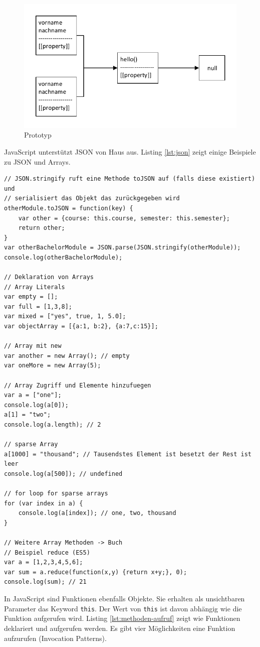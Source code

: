 \begin{figure}
\centering
\includegraphics[width=0.7\linewidth]{fig/prototyp}
\caption{Prototyp}
\label{fig:prototyp}
\end{figure}

JavaScript unterstützt JSON von Haus aus. Listing \ref{lst:json} zeigt einige Beispiele zu JSON und Arrays.

\begin{lstlisting}[label=lst:json,caption=JSON]
// JSON.stringify ruft eine Methode toJSON auf (falls diese existiert) und 
// serialisiert das Objekt das zurückgegeben wird
otherModule.toJSON = function(key) {
	var other = {course: this.course, semester: this.semester};
	return other;
}
var otherBachelorModule = JSON.parse(JSON.stringify(otherModule));
console.log(otherBachelorModule);

// Deklaration von Arrays
// Array Literals
var empty = [];
var full = [1,3,8];
var mixed = ["yes", true, 1, 5.0];
var objectArray = [{a:1, b:2}, {a:7,c:15}];

// Array mit new
var another = new Array(); // empty
var oneMore = new Array(5);

// Array Zugriff und Elemente hinzufuegen
var a = ["one"];
console.log(a[0]);
a[1] = "two";
console.log(a.length); // 2

// sparse Array
a[1000] = "thousand"; // Tausendstes Element ist besetzt der Rest ist leer
console.log(a[500]); // undefined

// for loop for sparse arrays
for (var index in a) {
	console.log(a[index]); // one, two, thousand
}

// Weitere Array Methoden -> Buch
// Beispiel reduce (ES5)
var a = [1,2,3,4,5,6];
var sum = a.reduce(function(x,y) {return x+y;}, 0);
console.log(sum); // 21
\end{lstlisting}

In JavaScript sind Funktionen ebenfalls Objekte. Sie erhalten als unsichtbaren Parameter das Keyword \lstinline|this|. Der Wert von \lstinline|this| ist davon abhängig wie die Funktion aufgerufen wird. Listing \ref{lst:methoden-aufruf} zeigt wie Funktionen deklariert und aufgerufen werden. Es gibt vier Möglichkeiten eine Funktion aufzurufen (Invocation Patterns).

